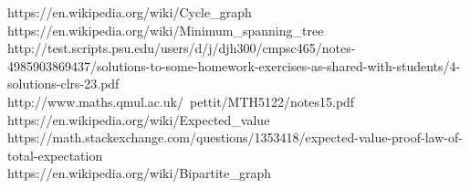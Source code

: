 \documentclass[12pt]{article}
\begin{document}
\newpage
\begin{thebibliography}{10}
	 https://en.wikipedia.org/wiki/Cycle\_graph\\
	 https://en.wikipedia.org/wiki/Minimum\_spanning\_tree\\
	 http://test.scripts.psu.edu/users/d/j/djh300/cmpsc465/notes-4985903869437/solutions-to-some-homework-exercises-as-shared-with-students/4-solutions-clrs-23.pdf\\
	 http://www.maths.qmul.ac.uk/~pettit/MTH5122/notes15.pdf\\
	 https://en.wikipedia.org/wiki/Expected\_value\\
	 https://math.stackexchange.com/questions/1353418/expected-value-proof-law-of-total-expectation\\
	 https://en.wikipedia.org/wiki/Bipartite\_graph
\end{thebibliography}
\end{document}
